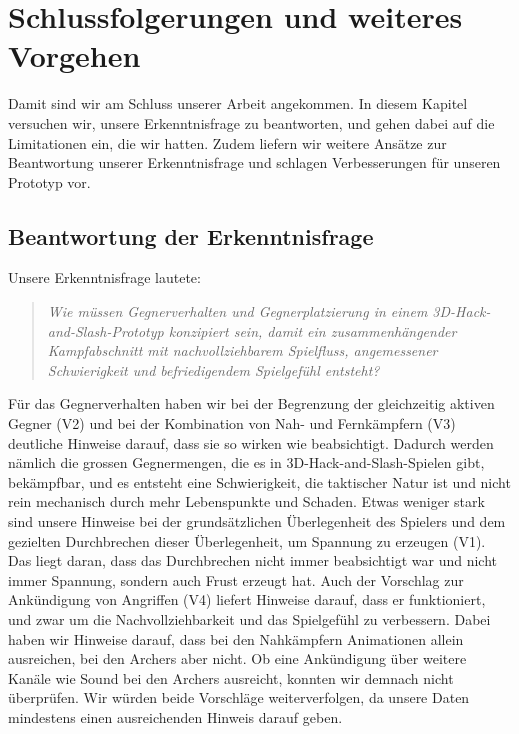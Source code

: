 \documentclass[../Main.tex]{subfiles}
\begin{document}
\section{Schlussfolgerungen und weiteres Vorgehen} \label{sec:Schlussfolgerungen}

Damit sind wir am Schluss unserer Arbeit angekommen. In diesem Kapitel versuchen wir, unsere Erkenntnisfrage zu beantworten, und gehen dabei auf die Limitationen ein, die wir hatten. Zudem liefern wir weitere Ansätze zur Beantwortung unserer Erkenntnisfrage und schlagen Verbesserungen für unseren Prototyp vor.

\subsection{Beantwortung der Erkenntnisfrage} \label{sec:Beantwortung}

Unsere Erkenntnisfrage lautete:

\begin{quote}
    \textit{Wie müssen Gegnerverhalten und Gegnerplatzierung in einem 3D-Hack-and-Slash-Prototyp konzipiert sein, damit ein zusammenhängender Kampfabschnitt mit nachvollziehbarem Spielfluss, angemessener Schwierigkeit und befriedigendem Spielgefühl entsteht?}
\end{quote}

Für das Gegnerverhalten haben wir bei der Begrenzung der gleichzeitig aktiven Gegner (V2) und bei der Kombination von Nah- und Fernkämpfern (V3) deutliche Hinweise darauf, dass sie so wirken wie beabsichtigt. Dadurch werden nämlich die grossen Gegnermengen, die es in 3D-Hack-and-Slash-Spielen gibt, bekämpfbar, und es entsteht eine Schwierigkeit, die taktischer Natur ist und nicht rein mechanisch durch mehr Lebenspunkte und Schaden. Etwas weniger stark sind unsere Hinweise bei der grundsätzlichen Überlegenheit des Spielers und dem gezielten Durchbrechen dieser Überlegenheit, um Spannung zu erzeugen (V1). Das liegt daran, dass das Durchbrechen nicht immer beabsichtigt war und nicht immer Spannung, sondern auch Frust erzeugt hat. Auch der Vorschlag zur Ankündigung von Angriffen (V4) liefert Hinweise darauf, dass er funktioniert, und zwar um die Nachvollziehbarkeit und das Spielgefühl zu verbessern. Dabei haben wir Hinweise darauf, dass bei den Nahkämpfern Animationen allein ausreichen, bei den Archers aber nicht. Ob eine Ankündigung über weitere Kanäle wie Sound bei den Archers ausreicht, konnten wir demnach nicht überprüfen. Wir würden beide Vorschläge weiterverfolgen, da unsere Daten mindestens einen ausreichenden Hinweis darauf geben.
\end{document}

